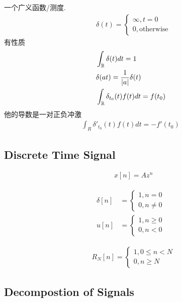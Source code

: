 \documentclass{article}
\begin{document}
     一个广义函数/测度. \begin{align}
        &\delta(t) = \begin{cases}
            \infty, t=0\\
            0, \text{otherwise}
        \end{cases}
    \end{align}
    有性质\begin{align}
        &\int_{\mathbb{R}} \delta(t)dt = 1\\
        &\delta(at) = \frac{1}{|a|} \delta(t)\\
        &\int_{\mathbb{R}} \delta_{t_0}(t) f(t) dt = f(t_0)
    \end{align}
    他的导数是一对正负冲激\begin{align}
        \int_R \delta'_{t_0}(t) f(t)dt = -f'(t_0)
    \end{align}

\subsection{Discrete Time Signal}

     \begin{align}
        &x[n] = A z^n
    \end{align}

     \begin{align}
        \delta[n] &= \begin{cases}
            1, n=0\\
            0, n\not=0
        \end{cases}\\
        u[n]&=\begin{cases}
            1, n\ge0\\
            0, n<0
        \end{cases}
    \end{align}

     \begin{align}
        &R_N[n] = \begin{cases}
            1, 0\le n < N \\
            0, n\ge N
        \end{cases}
    \end{align}

\subsection{Decompostion of Signals}
\end{document}
